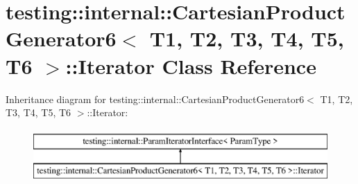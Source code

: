 \hypertarget{classtesting_1_1internal_1_1_cartesian_product_generator6_1_1_iterator}{}\section{testing\+:\+:internal\+:\+:Cartesian\+Product\+Generator6$<$ T1, T2, T3, T4, T5, T6 $>$\+:\+:Iterator Class Reference}
\label{classtesting_1_1internal_1_1_cartesian_product_generator6_1_1_iterator}
Inheritance diagram for testing\+:\+:internal\+:\+:Cartesian\+Product\+Generator6$<$ T1, T2, T3, T4, T5, T6 $>$\+:\+:Iterator\+:\begin{figure}[H]
\begin{center}
\leavevmode
\includegraphics[height=2.000000cm]{classtesting_1_1internal_1_1_cartesian_product_generator6_1_1_iterator}
\end{center}
\end{figure}
